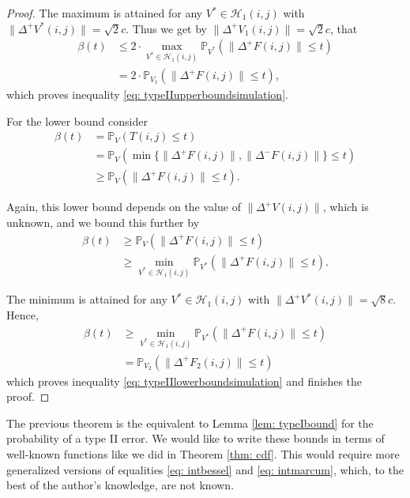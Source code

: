 \documentclass[a4paper,12pt]{article}
\newcommand{\norm}[1]{\lVert#1\rVert}
\theoremstyle{plain}
\theoremstyle{definition}
\begin{document}
\begin{proof}
	The maximum is attained for any $V^* \in \mathcal{H}_1(i, j)$ with $\norm{\Delta^+ V^*(i, j)} = \sqrt{2} c$. Thus we get by $\norm{\Delta^+ V_1(i, j)} = \sqrt{2} c$, that
	\begin{align*}
		\beta(t) &\leq 2 \cdot \max_{V^* \in \mathcal{H}_1(i, j)} \mathbb{P}_{V^*}\left( \norm{\Delta^+ F(i, j)} \leq t \right) \\
		&= 2 \cdot \mathbb{P}_{V_1}\left( \norm{\Delta^+ F(i, j)} \leq t \right),
	\end{align*}
	which proves inequality \eqref{eq: typeIIupperboundsimulation}.
	
	For the lower bound consider
	\begin{align*}
		\beta(t) &= \mathbb{P}_V\left( T(i, j) \leq t \right) \\
		&= \mathbb{P}_V\left( \min \{ \norm{\Delta^+ F(i, j)}, \norm{\Delta^- F(i, j)} \} \leq t \right) \\
		&\geq \mathbb{P}_V\left( \norm{\Delta^+ F(i, j)} \leq t \right).
	\end{align*}
	
	Again, this lower bound depends on the value of $\norm{\Delta^+ V(i, j)}$, which is unknown, and we bound this further by
	\begin{align*}
		\beta(t) &\geq \mathbb{P}_V\left( \norm{\Delta^+ F(i, j)} \leq t \right) \\
		&\geq \min_{V^* \in \mathcal{H}_1(i, j)} \mathbb{P}_{V^*}\left( \norm{\Delta^+ F(i, j)} \leq t \right).
	\end{align*}
	
	The minimum is attained for any $V^* \in \mathcal{H}_1(i, j)$ with $\norm{\Delta^+ V^*(i, j)} = \sqrt{8} c$. Hence,
	\begin{align*}
		\beta(t) &\geq \min_{V^* \in \mathcal{H}_1(i, j)} \mathbb{P}_{V^*}\left( \norm{\Delta^+ F(i, j)} \leq t \right) \\
		&= \mathbb{P}_{V_2}\left( \norm{\Delta^+ F_2(i, j)} \leq t \right)
	\end{align*}
	which proves inequality \eqref{eq: typeIIlowerboundsimulation} and finishes the proof.
\end{proof}

The previous theorem is the equivalent to Lemma \ref{lem: typeIbound} for the probability of a type II error. We would like to write these bounds in terms of well-known functions like we did in Theorem \ref{thm: cdf}. This would require more generalized versions of equalities \eqref{eq: intbessel} and \eqref{eq: intmarcum}, which, to the best of the author's knowledge, are not known.
\end{document}
